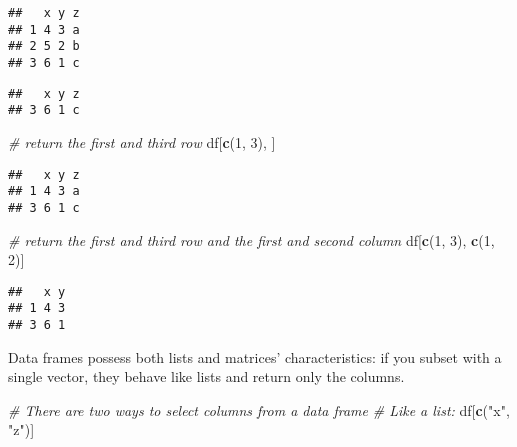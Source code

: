 \documentclass[
]{book}
\newenvironment{Shaded}{\begin{snugshade}}{\end{snugshade}}
\newcommand{\CommentTok}[1]{\textcolor[rgb]{0.56,0.35,0.01}{\textit{#1}}}
\newcommand{\DecValTok}[1]{\textcolor[rgb]{0.00,0.00,0.81}{#1}}
\newcommand{\KeywordTok}[1]{\textcolor[rgb]{0.13,0.29,0.53}{\textbf{#1}}}
\newcommand{\NormalTok}[1]{#1}
\newcommand{\OperatorTok}[1]{\textcolor[rgb]{0.81,0.36,0.00}{\textbf{#1}}}
\newcommand{\StringTok}[1]{\textcolor[rgb]{0.31,0.60,0.02}{#1}}
\begin{document}
\begin{verbatim}
##   x y z
## 1 4 3 a
## 2 5 2 b
## 3 6 1 c
\end{verbatim}

\begin{Shaded}
\end{Shaded}

\begin{verbatim}
##   x y z
## 3 6 1 c
\end{verbatim}

\begin{Shaded}
\begin{Highlighting}[]
\CommentTok{\# return the first and third row}
\NormalTok{df[}\KeywordTok{c}\NormalTok{(}\DecValTok{1}\NormalTok{, }\DecValTok{3}\NormalTok{), ]}
\end{Highlighting}
\end{Shaded}

\begin{verbatim}
##   x y z
## 1 4 3 a
## 3 6 1 c
\end{verbatim}

\begin{Shaded}
\begin{Highlighting}[]
\CommentTok{\# return the first and third row and the first and second column}
\NormalTok{df[}\KeywordTok{c}\NormalTok{(}\DecValTok{1}\NormalTok{, }\DecValTok{3}\NormalTok{), }\KeywordTok{c}\NormalTok{(}\DecValTok{1}\NormalTok{, }\DecValTok{2}\NormalTok{)]}
\end{Highlighting}
\end{Shaded}

\begin{verbatim}
##   x y
## 1 4 3
## 3 6 1
\end{verbatim}

Data frames possess both lists and matrices' characteristics: if you subset with a single vector, they behave like lists and return only the columns.

\begin{Shaded}
\begin{Highlighting}[]
\CommentTok{\# There are two ways to select columns from a data frame}
\CommentTok{\# Like a list:}
\NormalTok{df[}\KeywordTok{c}\NormalTok{(}\StringTok{"x"}\NormalTok{, }\StringTok{"z"}\NormalTok{)]}
\end{Highlighting}
\end{Shaded}
\end{document}
